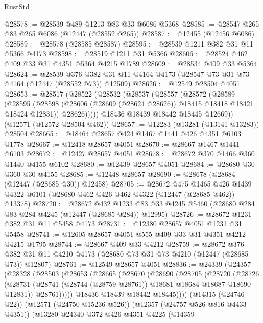 \begin{lexlean}{RustStd}
\begin{coremodule}
@28578 := @28539 @489 @1213 @83 @33 @6086 @5368
@28585 := @28547 @265 @83 @265 @6086 (@12447 (@28552 @265))
@28587 := @12455 (@12456 @6086)
@28589 := @28578 (@28585 @28587)
@28595 := @28539 @1211 @382 @31 @11 @5366 @4173
@28598 := @28519 @1211 @31 @5366
@28606 := @28524 @462 @409 @33 @31 @4351 @5364 @4215 @1789
@28609 := @28534 @409 @33 @5364
@28624 := @28539
    @376
    @382
    @31
    @11
    @4164
    @4173
    (@28547 @73 @31 @73 @4164 (@12447 (@28552 @73)) @12509)
@28626 := @12549 @28504 @4051
@28653 := @28517
    (@28522
      (@28532
        (@28537
          (@28557
            (@28572
              (@28589
                (@28595
                  (@28598 (@28606 (@28609 (@28624 @28626)) @18415 @18418 @18421 @18424 @12831))
                  @28626)))))
        @18436
        @18439
        @18442
        @18445
        @12669))
    (@12571 (@12572 @28504 @462))
@28657 := @12283 (@13281 (@13141 @13283)) @28504
@28665 := @18464 @28657 @424 @1467 @1441 @426 @4351 @6103 @1778
@28667 := @12418 @28657 @4051
@28670 := @28667 @1467 @1441 @6103
@28672 := @12427 @28657 @4051
@28678 := @28672 @370 @1466 @360 @1440 @4155 @6102
@28680 := @12439 @28657 @4051
@28684 := @28680 @30 @360 @30 @4155
@28685 := @12448 @28657
@28690 := @28678 (@28684 (@12447 (@28685 @30)) @12458)
@28705 := @28672
    @475
    @1465
    @426
    @1439
    @4322
    @6101
    (@28680 @462 @426 @462 @4322 (@12447 (@28685 @462)) @13378)
@28720 := @28672
    @432
    @1233
    @83
    @33
    @4245
    @5460
    (@28680 @284 @83 @284 @4245 (@12447 (@28685 @284)) @12995)
@28726 := @28672 @1231 @382 @31 @11 @5458 @4173
@28731 := @12380 @28657 @4051 @1231 @31 @5458
@28741 := @12605 @28657 @4051 @555 @409 @33 @31 @4351 @4212 @4215 @1795
@28744 := @28667 @409 @33 @4212
@28759 := @28672
    @376
    @382
    @31
    @11
    @4210
    @4173
    (@28680 @73 @31 @73 @4210 (@12447 (@28685 @73)) @12807)
@28761 := @12549 @28657 @4051
@28836 := @24339
    (@24357
      (@28328
        (@28503
          (@28653
            (@28665
              (@28670
                (@28690
                  (@28705
                    (@28720
                      (@28726
                        (@28731
                          (@28741 (@28744 (@28759 @28761)) @18681 @18684 @18687 @18690 @12831))
                        @28761)))))
              @18436
              @18439
              @18442
              @18445))))
      (@14315 (@24746 @22))
      (@12571 (@24750 @15236 @526))
      (@12357 (@24757 @526 @816 @4433 @4351))
      (@13280
        @24340
        @372
        @426
        @4351
        @4225
        (@14359

\end{coremodule}
\end{lexlean}
